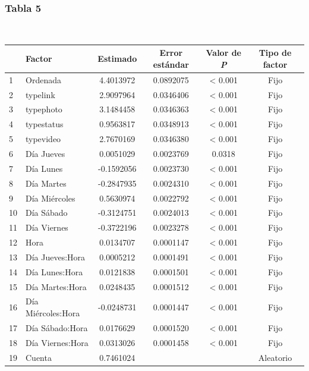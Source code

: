 \documentclass[a4paper,10pt]{article}
\begin{document}
\subsubsection{Tabla 5}
\begin{center}
 \\[0.3cm]
  \begin{tabular}{l|l|c|c|c|c}
     \hline
    & Factor & Estimado & Error estándar & Valor de \textit{P} & Tipo de factor\\
    \hline
    1 & Ordenada & 4.4013972 & 0.0892075 & < 0.001 & Fijo \\
    2 & typelink & 2.9097964 & 0.0346406 & < 0.001 & Fijo \\
    3 & typephoto & 3.1484458 & 0.0346363 & < 0.001 & Fijo \\
    4 & typestatus & 0.9563817 & 0.0348913 & < 0.001 & Fijo \\
    5 & typevideo & 2.7670169 & 0.0346380 & < 0.001 & Fijo \\
    6 & Día Jueves & 0.0051029 & 0.0023769 & 0.0318 & Fijo \\
    7 & Día Lunes & -0.1592056 & 0.0023730 & < 0.001 & Fijo \\
    8 & Día Martes & -0.2847935 & 0.0024310 & < 0.001 & Fijo \\
    9 & Día Miércoles & 0.5630974 & 0.0022792 & < 0.001 & Fijo \\
    10 & Día Sábado & -0.3124751 & 0.0024013 & < 0.001 & Fijo \\
    11 & Día Viernes & -0.3722196 & 0.0023278 & < 0.001 & Fijo \\
    12 & Hora & 0.0134707 & 0.0001147 & < 0.001 & Fijo \\
    13 & Día Jueves:Hora & 0.0005212 & 0.0001491 & < 0.001 & Fijo \\
    14 & Día Lunes:Hora & 0.0121838 & 0.0001501 & < 0.001 & Fijo \\
    15 & Día Martes:Hora & 0.0248435 & 0.0001512 & < 0.001 & Fijo \\
    16 & Día Miércoles:Hora & -0.0248731 & 0.0001447 & < 0.001 & Fijo \\
    17 & Día Sábado:Hora & 0.0176629 & 0.0001520 & < 0.001 & Fijo \\
    18 & Día Viernes:Hora & 0.0313026 & 0.0001458 & < 0.001 & Fijo \\
    19 & Cuenta & 0.7461024 &  &  & Aleatorio \\
    \hline
  \end{tabular}
\end{center}
\end{document}
